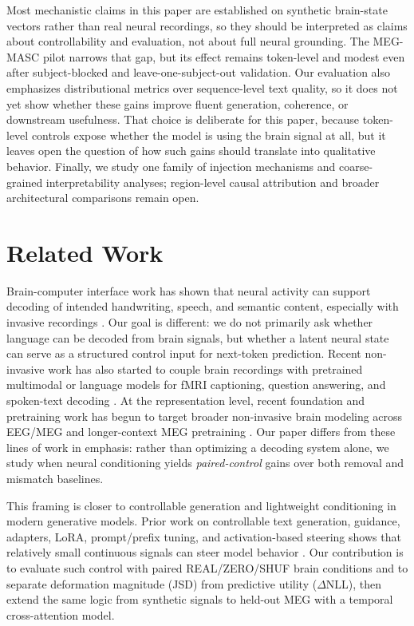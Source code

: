\documentclass{article}
\theoremstyle{plain}
\theoremstyle{definition}
\theoremstyle{remark}
\begin{document}
Most mechanistic claims in this paper are established on synthetic brain-state vectors rather than real neural recordings, so they should be interpreted as claims about controllability and evaluation, not about full neural grounding.
The MEG-MASC pilot narrows that gap, but its effect remains token-level and modest even after subject-blocked and leave-one-subject-out validation.
Our evaluation also emphasizes distributional metrics over sequence-level text quality, so it does not yet show whether these gains improve fluent generation, coherence, or downstream usefulness.
That choice is deliberate for this paper, because token-level controls expose whether the model is using the brain signal at all, but it leaves open the question of how such gains should translate into qualitative behavior.
Finally, we study one family of injection mechanisms and coarse-grained interpretability analyses; region-level causal attribution and broader architectural comparisons remain open.



\section{Related Work}

Brain-computer interface work has shown that neural activity can support decoding of intended handwriting, speech, and semantic content, especially with invasive recordings \citep{anumanchipalli2019speechsynthesis,makin2020handwriting,willett2021handwriting,moses2021neuroprosthesis,willett2023speechavatar,tang2023semanticreconstruction}.
Our goal is different: we do not primarily ask whether language can be decoded from brain signals, but whether a latent neural state can serve as a structured control input for next-token prediction.
Recent non-invasive work has also started to couple brain recordings with pretrained multimodal or language models for fMRI captioning, question answering, and spoken-text decoding \citep{huang2024brainchat,hmamouche2024multimodalbrain}.
At the representation level, recent foundation and pretraining work has begun to target broader non-invasive brain modeling across EEG/MEG and longer-context MEG pretraining \citep{xiao2025brainomni,jayalath2026megxl}.
Our paper differs from these lines of work in emphasis: rather than optimizing a decoding system alone, we study when neural conditioning yields \emph{paired-control} gains over both removal and mismatch baselines.

This framing is closer to controllable generation and lightweight conditioning in modern generative models.
Prior work on controllable text generation, guidance, adapters, LoRA, prompt/prefix tuning, and activation-based steering shows that relatively small continuous signals can steer model behavior \citep{keskar2019ctrl,dathathri2020pplm,dhariwal2021diffusionbeatgans,perez2018film,houlsby2019adapters,hu2021lora,li2021prefixtuning,lester2021prompttuning,scalena2024dynamicactivationcomposition}.
Our contribution is to evaluate such control with paired REAL/ZERO/SHUF brain conditions and to separate deformation magnitude (JSD) from predictive utility ($\Delta$NLL), then extend the same logic from synthetic signals to held-out MEG with a temporal cross-attention model.
\end{document}
